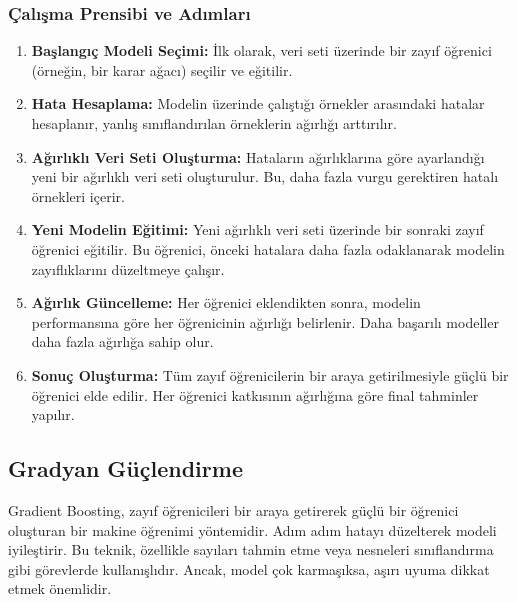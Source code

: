 \subsubsection{Çalışma Prensibi ve Adımları}
\begin{enumerate}
\item \textbf{Başlangıç Modeli Seçimi:} İlk olarak, veri seti üzerinde bir zayıf öğrenici (örneğin, bir karar ağacı) seçilir ve eğitilir.
\item \textbf{Hata Hesaplama:} Modelin üzerinde çalıştığı örnekler arasındaki hatalar hesaplanır, yanlış sınıflandırılan örneklerin ağırlığı arttırılır.
\item \textbf{Ağırlıklı Veri Seti Oluşturma:} Hataların ağırlıklarına göre ayarlandığı yeni bir ağırlıklı veri seti oluşturulur. Bu, daha fazla vurgu gerektiren hatalı örnekleri içerir.
\item \textbf{Yeni Modelin Eğitimi:} Yeni ağırlıklı veri seti üzerinde bir sonraki zayıf öğrenici eğitilir. Bu öğrenici, önceki hatalara daha fazla odaklanarak modelin zayıflıklarını düzeltmeye çalışır.
\item \textbf{Ağırlık Güncelleme:} Her öğrenici eklendikten sonra, modelin performansına göre her öğrenicinin ağırlığı belirlenir. Daha başarılı modeller daha fazla ağırlığa sahip olur.
\item \textbf{Sonuç Oluşturma:} Tüm zayıf öğrenicilerin bir araya getirilmesiyle güçlü bir öğrenici elde edilir. Her öğrenici katkısının ağırlığına göre final tahminler yapılır.
\end{enumerate}

\subsection{Gradyan Güçlendirme}
Gradient Boosting, zayıf öğrenicileri bir araya getirerek güçlü bir öğrenici oluşturan bir makine öğrenimi yöntemidir. Adım adım hatayı düzelterek modeli iyileştirir. Bu teknik, özellikle sayıları tahmin etme veya nesneleri sınıflandırma gibi görevlerde kullanışlıdır. Ancak, model çok karmaşıksa, aşırı uyuma dikkat etmek önemlidir. 


